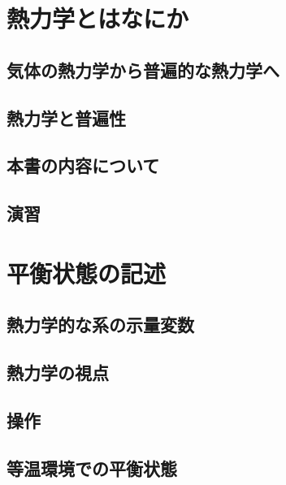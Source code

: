 \documentclass[dvipdfmx,oneside]{jsbook}
\begin{document}
\tableofcontents

\chapter{熱力学とはなにか}

\section{気体の熱力学から普遍的な熱力学へ}

\section{熱力学と普遍性}
\section{本書の内容について}

\section*{演習}


\chapter{平衡状態の記述}

\section{熱力学的な系の示量変数}

\section{熱力学の視点}

\section{操作}

\section{等温環境での平衡状態}

\end{document}
